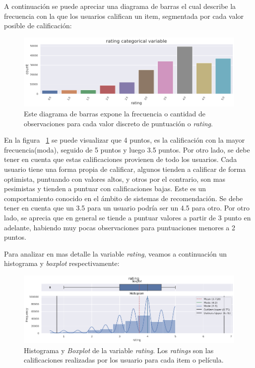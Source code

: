 \documentclass[11pt,a4paper,twoside]{thesis}
\begin{document}
A continuación se puede apreciar una diagrama de barras el cual describe la
frecuencia con la que los usuarios califican un item, segmentada por cada valor
posible de calificación:

\begin{figure}[h!]
	\centering
	\includegraphics[width=15cm]{./images/rating-barplot.png}
	\caption{Este diagrama de barras expone la frecuencia o cantidad de observaciones para cada valor discreto de puntuación o \textit{rating}.}
	\label{fig:ratingsBarPlot}
\end{figure}

En la figura ~\ref{fig:ratingsBarPlot} se puede visualizar que 4 puntos, es la
calificación con la mayor frecuencia(moda), seguido de 5 puntos y luego 3.5
puntos. Por otro lado, se debe tener en cuenta que estas calificaciones
provienen de todo los usuarios. Cada usuario tiene una forma propia de
calificar, algunos tienden a calificar de forma optimista, puntuando con
valores altos, y otros por el contrario, son mas pesimistas y tienden a puntuar
con calificaciones bajas. Este es un comportamiento conocido en el ámbito de
sistemas de recomendación. Se debe tener en cuenta que un 3.5 para un usuario
podría ser un 4.5 para otro. Por otro lado, se aprecia que en general se tiende
a puntuar valores a partir de 3 punto en adelante, habiendo muy pocas
observaciones para puntuaciones menores a 2 puntos.

\clearpage

Para analizar en mas detalle la variable \textit{rating}, veamos a continuación
un histograma y \textit{boxplot} respectivamente:

\begin{center}
\end{center}

\begin{figure}[h!]
	\centering
	\includegraphics[width=15cm]{./images/rating-boxplot-histplot.png}
	\caption{Histograma y \textit{Boxplot} de la variable \textit{rating}. Los \textit{ratings} son las calificaciones realizadas por los usuario para cada item o película.}
	\label{fig:ratingsHistPlot}
\end{figure}
\end{document}
